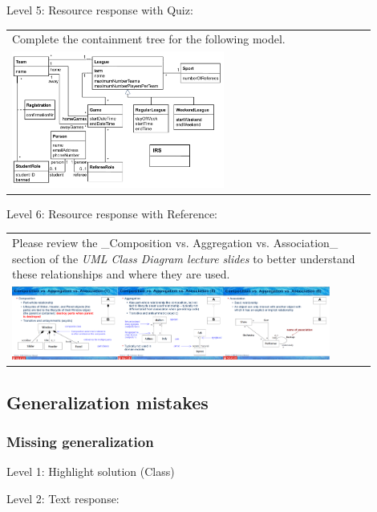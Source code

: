 \noindent Level 5: Resource response with Quiz: \medskip

\begin{tabular}{|p{0.9\linewidth}}
Complete the containment tree for the following model.

\\
\includegraphics[width=0.6\textwidth]{images/IRS.png}
\end{tabular} \medskip

\noindent Level 6: Resource response with Reference: \medskip

\begin{tabular}{|p{0.9\linewidth}}
Please review the _Composition vs. Aggregation vs. Association_ section of 
the \textit{UML Class Diagram lecture slides} to 
better understand these relationships and where they are used.

\\
\includegraphics[width=0.9\textwidth]{images/composition_aggregation_association.png}
\end{tabular} \medskip


\subsection{Generalization mistakes}

\subsubsection{Missing generalization}

\noindent Level 1: Highlight solution (Class) \medskip

\noindent Level 2: Text response: \medskip

